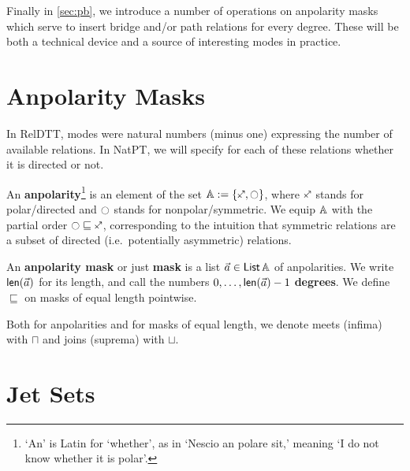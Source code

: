 \documentclass[a4paper]{memoir}
\begin{document}
Finally in \cref{sec:pb}, we introduce a number of operations on anpolarity masks which serve to insert bridge and/or path relations for every degree.
These will be both a technical device and a source of interesting modes in practice. 


\section{Anpolarity Masks} \label{sec:mask}
In RelDTT, modes were natural numbers (minus one) expressing the number of available relations.
In NatPT, we will specify for each of these relations whether it is directed or not.
\begin{definition}
	\label{def:anpolarity}
	\label{def:anpolarity-order}
	An \textbf{anpolarity}\footnote{`An' is Latin for `whether', as in `Nescio an polare sit,' meaning `I do not know whether it is polar'.} is an element of the set $\Anpolarity := \accol{\ypolar, \npolar}$, where $\ypolar$ stands for polar/directed and $\npolar$ stands for nonpolar/symmetric.
	We equip ${\mathbb{A}}$ with the partial order $\npolar \sqsubseteq \ypolar$, corresponding to the intuition that symmetric relations are a subset of directed (i.e.\ potentially asymmetric) relations.
	
	An \textbf{anpolarity mask} or just \textbf{mask} is a list $\vec a \in {\mathsf{List}}\,{\mathbb{A}}$ of anpolarities. We write $\mathsf{len}(\vec a)$ for its length, and call the numbers $0, \ldots, \mathsf{len}(\vec a) - 1$ \textbf{degrees}.
	We define $\sqsubseteq$ on masks of equal length pointwise.
	
	Both for anpolarities and for masks of equal length, we denote meets (infima) with $\sqcap$ and joins (suprema) with $\sqcup$.
\end{definition}

\section{Jet Sets} \label{sec:jetset}
\end{document}
